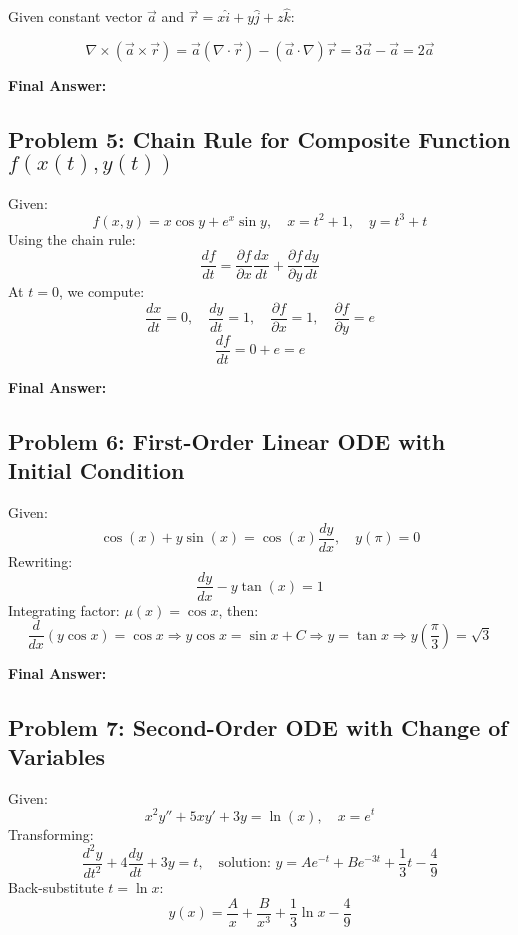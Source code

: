 \documentclass{article}
\begin{document}
Given constant vector \( \vec{a} \) and \( \vec{r} = x\hat{i} + y\hat{j} + z\hat{k} \):

\[
\nabla \times (\vec{a} \times \vec{r}) = \vec{a} (\nabla \cdot \vec{r}) - (\vec{a} \cdot \nabla) \vec{r} = 3\vec{a} - \vec{a} = 2\vec{a}
\]

\noindent\textbf{Final Answer: } 

\bigskip

\subsection*{Problem 5: Chain Rule for Composite Function \( f(x(t), y(t)) \)}

Given:
\[
f(x, y) = x \cos y + e^x \sin y, \quad x = t^2 + 1, \quad y = t^3 + t
\]
Using the chain rule:
\[
\frac{df}{dt} = \frac{\partial f}{\partial x} \frac{dx}{dt} + \frac{\partial f}{\partial y} \frac{dy}{dt}
\]
At \( t = 0 \), we compute:
\[
\frac{dx}{dt} = 0, \quad \frac{dy}{dt} = 1, \quad \frac{\partial f}{\partial x} = 1, \quad \frac{\partial f}{\partial y} = e
\]
\[
\frac{df}{dt} = 0 + e = e
\]

\noindent\textbf{Final Answer: } 

\bigskip

\subsection*{Problem 6: First-Order Linear ODE with Initial Condition}

Given:
\[
\cos(x) + y \sin(x) = \cos(x) \frac{dy}{dx}, \quad y(\pi) = 0
\]
Rewriting:
\[
\frac{dy}{dx} - y \tan(x) = 1
\]
Integrating factor: \( \mu(x) = \cos x \), then:
\[
\frac{d}{dx}(y \cos x) = \cos x \Rightarrow y \cos x = \sin x + C
\Rightarrow y = \tan x
\Rightarrow y\left(\frac{\pi}{3}\right) = \sqrt{3}
\]

\noindent\textbf{Final Answer: } 

\bigskip

\subsection*{Problem 7: Second-Order ODE with Change of Variables}

Given:
\[
x^2 y'' + 5x y' + 3y = \ln(x), \quad x = e^t
\]
Transforming:
\[
\frac{d^2y}{dt^2} + 4\frac{dy}{dt} + 3y = t, \quad \text{solution: } y = Ae^{-t} + Be^{-3t} + \frac{1}{3}t - \frac{4}{9}
\]
Back-substitute \( t = \ln x \):
\[
y(x) = \frac{A}{x} + \frac{B}{x^3} + \frac{1}{3} \ln x - \frac{4}{9}
\]
\end{document}
